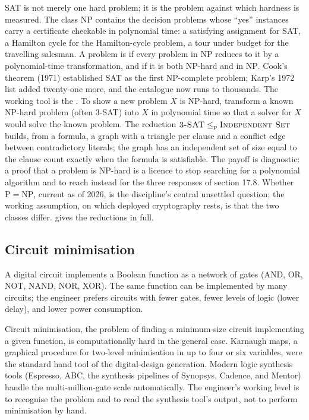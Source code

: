 \begin{mastery}
SAT is not merely one hard problem; it is the 
problem against which hardness is measured. The class $\mathrm{NP}$
contains the decision problems whose ``yes'' instances carry a
certificate checkable in polynomial time: a satisfying assignment
for SAT, a Hamilton cycle for the Hamilton-cycle problem, a tour
under budget for the travelling salesman. A problem is
 if every problem in $\mathrm{NP}$ reduces to it by
a polynomial-time transformation, and  if it is
both NP-hard and in $\mathrm{NP}$. Cook's theorem (1971) established
SAT as the first NP-complete problem; Karp's 1972 list added
twenty-one more, and the catalogue now runs to thousands. The
working tool is the . To show a new problem $X$
is NP-hard, transform a known NP-hard problem (often 3-SAT) into $X$
in polynomial time so that a solver for $X$ would solve the known
problem. The reduction $\textsc{3-SAT} \leq_{p} \textsc{Independent
Set}$ builds, from a formula, a graph with a triangle per clause and
a conflict edge between contradictory literals; the graph has an
independent set of size equal to the clause count exactly when the
formula is satisfiable. The payoff is diagnostic: a proof that a
problem is NP-hard is a licence to stop searching for a polynomial
algorithm and to reach instead for the three responses of section
17.8. Whether $\mathrm{P} = \mathrm{NP}$, current as of 2026, is the
discipline's central unsettled question; the working assumption, on
which deployed cryptography rests, is that the two classes differ.
\cite{text:sipser} gives the reductions in full.
\end{mastery}

\subsection{Circuit minimisation}

A digital circuit implements a Boolean function as a network of
gates (AND, OR, NOT, NAND, NOR, XOR). The same function can be
implemented by many circuits; the engineer prefers circuits with
fewer gates, fewer levels of logic (lower delay), and lower power
consumption.

Circuit minimisation, the problem of finding a minimum-size circuit
implementing a given function, is computationally hard in the
general case. Karnaugh maps, a graphical procedure for two-level
minimisation in up to four or six variables, were the standard
hand tool of the digital-design generation. Modern logic synthesis
tools (Espresso, ABC, the synthesis pipelines of Synopsys, Cadence,
and Mentor) handle the multi-million-gate scale automatically. The
engineer's working level is to recognise the problem and to read
the synthesis tool's output, not to perform minimisation by hand.

